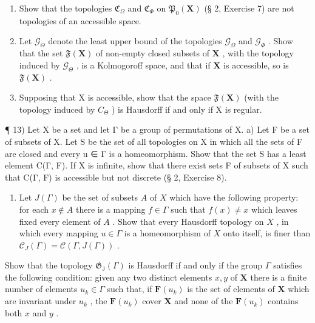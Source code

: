 \begin{enumerate}
\def\labelenumi{\alph{enumi})}
\item
  Show that the topologies \(\mathfrak{C}_{\Omega}\) and \(\mathfrak{C}_{\Phi}\) on \(\mathfrak{P}_0(\mathbf{X})\) (§ 2, Exercise 7) are not topologies of an accessible space.
\item
  Let \(\mathcal{G}_{\Theta}\) denote the least upper bound of the topologies \(\mathcal{G}_{\Omega}\) and \(\mathcal{G}_{\Phi}\) . Show that the set \(\mathfrak{F}(\mathbf{X})\) of non-empty closed subsets of \(\mathbf{X}\) , with the topology induced by \(\mathcal{G}_{\Theta}\) , is a Kolmogoroff space, and that if \(\mathbf{X}\) is accessible, so is \(\mathfrak{F}(\mathbf{X})\) .
\item
  Supposing that X is accessible, show that the space \(\mathfrak{F}(\mathbf{X})\) (with the topology induced by \(C_{\Theta}\) ) is Hausdorff if and only if X is regular.
\end{enumerate}

¶ 13) Let X be a set and let Γ be a group of permutations of X. a) Let F be a set of subsets of X. Let S be the set of all topologies on X in which all the sets of F are closed and every u ∈ Γ is a homeomorphism. Show that the set S has a least element C(Γ, F). If X is infinite, show that there exist sets F of subsets of X such that C(Γ, F) is accessible but not discrete (§ 2, Exercise 8).

\begin{enumerate}
\def\labelenumi{\alph{enumi})}
\setcounter{enumi}{1}
\tightlist
\item
  Let \(J(\Gamma)\) be the set of subsets \(A\) of \(X\) which have the following property: for each \(x \notin A\) there is a mapping \(f \in \Gamma\) such that \(f(x) \neq x\) which leaves fixed every element of \(A\) . Show that every Hausdorff topology on \(X\) , in which every mapping \(u \in \Gamma\) is a homeomorphism of \(X\) onto itself, is finer than \(\mathcal{C}_{J}(\Gamma) = \mathcal{C}(\Gamma, J(\Gamma))\) .
\end{enumerate}

Show that the topology \(\mathfrak{G}_{\mathrm{J}}(\Gamma)\) is Hausdorff if and only if the group \(\Gamma\) satisfies the following condition: given any two distinct elements \(x, y\) of \(\mathbf{X}\) there is a finite number of elements \(u_{k} \in \Gamma\) such that, if \(\mathbf{F}(u_{k})\) is the set of elements of \(\mathbf{X}\) which are invariant under \(u_{k}\) , the \(\mathbf{F}(u_{k})\) cover \(\mathbf{X}\) and none of the \(\mathbf{F}(u_{k})\) contains both \(x\) and \(y\) .

